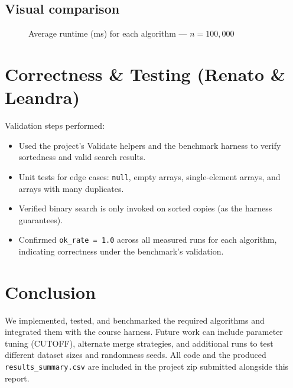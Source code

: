 \documentclass[11pt,a4paper]{article}
\begin{document}
\subsection{Visual comparison}
\begin{figure}[H]
\centering
\caption{Average runtime (ms) for each algorithm — $n=100{,}000$}
\end{figure}

\section{Correctness \& Testing (Renato \& Leandra)}
Validation steps performed:
\begin{itemize}
  \item Used the project's Validate helpers and the benchmark harness to verify sortedness and valid search results.
  \item Unit tests for edge cases: \texttt{null}, empty arrays, single-element arrays, and arrays with many duplicates.
  \item Verified binary search is only invoked on sorted copies (as the harness guarantees).
  \item Confirmed \texttt{ok\_rate = 1.0} across all measured runs for each algorithm, indicating correctness under the benchmark's validation.
\end{itemize}

\section{Conclusion}
We implemented, tested, and benchmarked the required algorithms and integrated them with the course harness. Future work can include parameter tuning (CUTOFF), alternate merge strategies, and additional runs to test different dataset sizes and randomness seeds. All code and the produced \texttt{results\_summary.csv} are included in the project zip submitted alongside this report.
\end{document}

